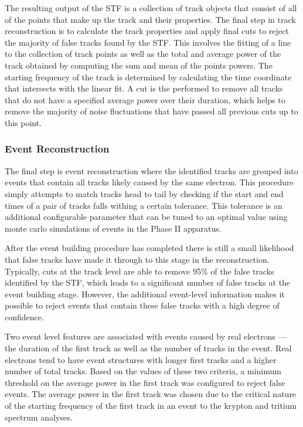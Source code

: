The resulting output of the STF is a collection of track objects that consist of all of the points that make up the track and their properties. The final step in track reconstruction is to calculate the track properties and apply final cuts to reject the majority of false tracks found by the STF. This involves the fitting of a line to the collection of track points as well as the total and average power of the track obtained by computing the sum and mean of the points powers. The starting frequency of the track is determined by calculating the time coordinate that  intersects with the linear fit. A cut is the performed to remove all tracks that do not have a specified average power over their duration, which helps to remove the majority of noise fluctuations that have passed all previous cuts up to this point.

\subsubsection*{Event Reconstruction}

The final step is event reconstruction where the identified tracks are grouped into events that contain all tracks likely caused by the same electron. This procedure simply attempts to match tracks head to tail by checking if the start and end times of a pair of tracks falls withing a certain tolerance. This tolerance is an additional configurable parameter that can be tuned to an optimal value using monte carlo simulations of events in the Phase II apparatus.

After the event building procedure has completed there is still a small likelihood that false tracks have made it through to this stage in the reconstruction. Typically, cuts at the track level are able to remove 95\% of the false tracks identified by the STF, which leads to a significant number of false tracks at the event building stage. However, the additional event-level information makes it possible to reject events that contain these false tracks with a high degree of confidence. 

Two event level features are associated with events caused by real electrons --- the duration of the first track as well as the number of tracks in the event. Real electrons tend to have event structures with longer first tracks and a higher number of total tracks. Based on the values of these two criteria, a minimum threshold on the average power in the first track was configured to reject false events. The average power in the first track was chosen due to the critical nature of the starting frequency of the first track in an event to the krypton and tritium spectrum analyses.

